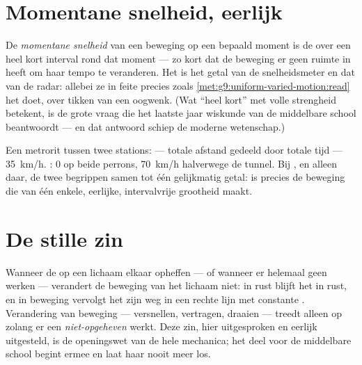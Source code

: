 \section{Momentane snelheid, eerlijk}

\begin{definition}\label{def:g9:uniform-varied-motion:instant}
De \emph{momentane snelheid} van een beweging
op een bepaald moment is de  over een heel
kort interval rond dat moment --- zo kort dat de beweging er geen ruimte
in heeft om haar tempo te veranderen. Het is het getal van de
snelheidsmeter en dat van de radar: allebei  ze in feite
precies zoals \cref{met:g9:uniform-varied-motion:read} het doet, over
tikken van een oogwenk. (Wat ``heel kort'' met volle strengheid
betekent, is de grote vraag die het laatste jaar wiskunde van de
middelbare school beantwoordt --- en dat antwoord schiep de moderne
wetenschap.)
\end{definition}

\begin{example}\label{ex:g9:uniform-varied-motion:sidebyside}
Een metrorit tussen twee stations:  ---
totale afstand gedeeld door totale tijd --- \qty{35}{km/h}.
: $0$ op beide perrons, \qty{70}{km/h}
halverwege de tunnel. Bij , en alleen daar,
 de twee begrippen samen tot één gelijkmatig getal:
 is precies de beweging die van
 één enkele, eerlijke, intervalvrije grootheid maakt.
\end{example}

\section{De stille zin}

\begin{proposition}\label{prop:g9:uniform-varied-motion:inertia}
Wanneer de  op een lichaam elkaar opheffen --- of
wanneer er helemaal geen werken --- verandert de beweging van het
lichaam niet: in rust blijft het in rust, en in beweging vervolgt het
zijn weg in een rechte lijn met constante .
Verandering van beweging --- versnellen, vertragen, draaien --- treedt
alleen op zolang er een \emph{niet-opgeheven}  werkt.
Deze zin, hier uitgesproken en eerlijk uitgesteld, is de openingswet van
de hele mechanica; het deel voor de middelbare school begint ermee en
laat haar nooit meer los.
\end{proposition}

